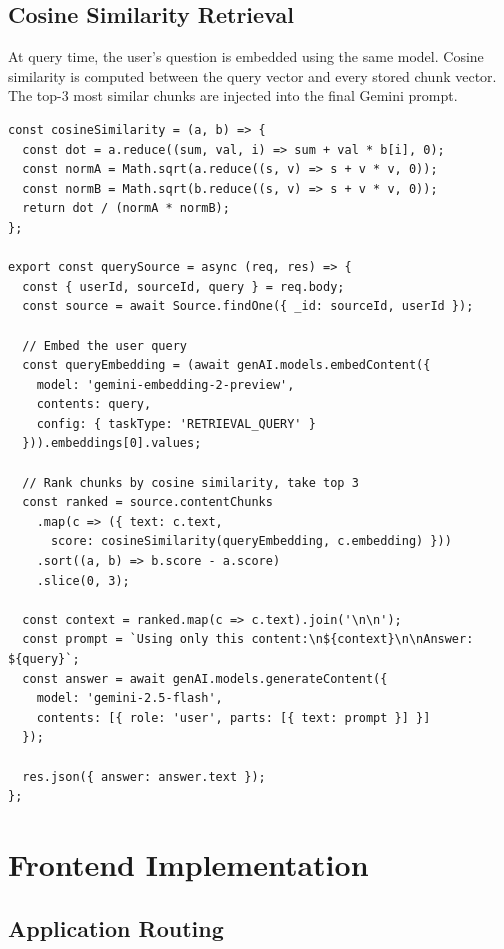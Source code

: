 \documentclass[12pt,a4paper]{report}
\begin{document}
\subsection{Cosine Similarity Retrieval}

At query time, the user's question is embedded using the same model. Cosine similarity is computed between the query vector and every stored chunk vector. The top-3 most similar chunks are injected into the final Gemini prompt.

\begin{lstlisting}[caption={sourceController.js — Cosine Similarity and Grounded Generation}]
const cosineSimilarity = (a, b) => {
  const dot = a.reduce((sum, val, i) => sum + val * b[i], 0);
  const normA = Math.sqrt(a.reduce((s, v) => s + v * v, 0));
  const normB = Math.sqrt(b.reduce((s, v) => s + v * v, 0));
  return dot / (normA * normB);
};

export const querySource = async (req, res) => {
  const { userId, sourceId, query } = req.body;
  const source = await Source.findOne({ _id: sourceId, userId });

  // Embed the user query
  const queryEmbedding = (await genAI.models.embedContent({
    model: 'gemini-embedding-2-preview',
    contents: query,
    config: { taskType: 'RETRIEVAL_QUERY' }
  })).embeddings[0].values;

  // Rank chunks by cosine similarity, take top 3
  const ranked = source.contentChunks
    .map(c => ({ text: c.text,
      score: cosineSimilarity(queryEmbedding, c.embedding) }))
    .sort((a, b) => b.score - a.score)
    .slice(0, 3);

  const context = ranked.map(c => c.text).join('\n\n');
  const prompt = `Using only this content:\n${context}\n\nAnswer: ${query}`;
  const answer = await genAI.models.generateContent({
    model: 'gemini-2.5-flash',
    contents: [{ role: 'user', parts: [{ text: prompt }] }]
  });

  res.json({ answer: answer.text });
};
\end{lstlisting}

\section{Frontend Implementation}

\subsection{Application Routing}
\end{document}
